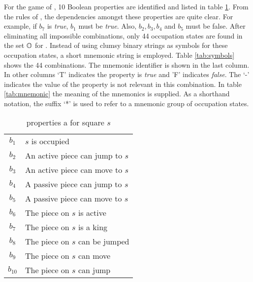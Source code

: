 For the game of , 10 Boolean properties are identified and listed in table \ref{tab:bool}.
From the rules of , the dependencies amongst these properties are quite clear.  For example, if $b_7$ is {\it true}, $b_1$ must be {\it true}.  Also, $b_2, b_3, b_4$ and $b_5$ must be false.  After eliminating all impossible combinations, only 44 occupation states are found in the set $\mathbb{O}$ for .  Instead of using clumsy binary strings as symbols for these occupation states, a short mnemonic string is employed.  Table \ref{tab:symbols} shows the 44 combinations. The mnemonic identifier is shown in the last column.  In other columns `T' indicates the property is {\it true} and 'F' indicates {\it false}.  The `-' indicates the value of the property is not relevant in this combination.  In table \ref{tab:mnemonic} the meaning of the mnemonics is supplied. As a shorthand notation, the suffix `*' is used to refer to a mnemonic group of occupation states.

\begin{table}
\caption { properties a for square $s$}
\begin{center}
\begin{tabular}[hbt]{|c|l|} 
\hline
$b_1$ & $s$ is occupied \\
$b_2$ & An active piece can jump to $s$\\ 
$b_3$ & An active piece can move to $s$ \\
$b_4$ & A passive piece can jump to $s$\\ 
$b_5$ & A passive piece can move to $s$ \\
$b_6$ & The piece on $s$ is active \\
$b_7$ & The piece on $s$ is a king \\
$b_8$ & The piece on $s$ can be jumped \\
$b_9$ & The piece on $s$ can move \\
$b_{10}$ & The piece on $s$ can jump \\
\hline
\end{tabular}
\end{center}
\label{tab:bool}
\end{table}

